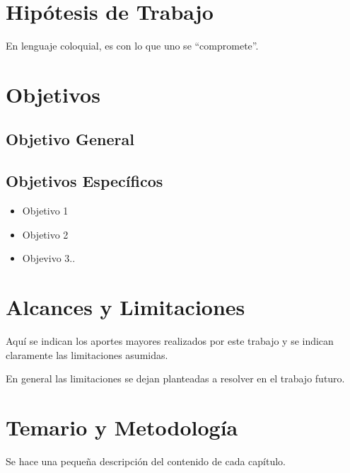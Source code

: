 \section{Hipótesis de Trabajo}
En lenguaje coloquial, es con lo que uno se ``compromete''.

\section{Objetivos}
\subsection{Objetivo General}


\subsection{Objetivos Específicos}
\begin{itemize}
 \item Objetivo 1
 \item Objetivo 2
 \item Objevivo 3..
\end{itemize}

\section{Alcances y Limitaciones}
Aquí se indican los aportes mayores realizados por este trabajo y se indican claramente las limitaciones asumidas.

En general las limitaciones se dejan planteadas a resolver en el trabajo futuro.


\section{Temario y Metodología}
Se hace una pequeña descripción del contenido de cada capítulo.